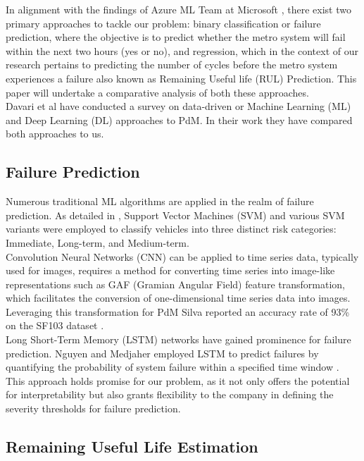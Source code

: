 \documentclass{article}
\begin{document}
In alignment with the findings of Azure ML Team at Microsoft \cite{AzureML2015}, there exist two primary approaches to tackle our problem: binary classification or failure prediction, where the objective is to predict whether the metro system will fail within the next two hours (yes or no), and regression, which in the context of our research pertains to predicting the number of cycles before the metro system experiences a failure also known as Remaining Useful life (RUL) Prediction. This paper will undertake a comparative analysis of both these approaches. \\

Davari et al \cite{Davari2021} have conducted a survey on data-driven or Machine Learning (ML) and Deep Learning (DL) approaches to PdM. In their work they have compared both approaches to us.

\subsection*{Failure Prediction}

Numerous traditional ML algorithms are applied in the realm of failure prediction. As detailed in \cite{chaudhuri2018}, Support Vector Machines (SVM) and various SVM variants were employed to classify vehicles into three distinct risk categories: Immediate, Long-term, and Medium-term. \\

Convolution Neural Networks (CNN) can be applied to time series data, typically used for
images, requires a method for converting time series into image-like representations such as GAF (Gramian Angular Field) feature transformation, which facilitates the conversion of one-dimensional time series data into images. Leveraging this transformation for PdM Silva reported an accuracy rate of 93\% on the SF103 dataset \cite{Silva2019}. \\

Long Short-Term Memory (LSTM) networks have gained prominence for failure prediction. Nguyen and Medjaher employed LSTM to predict failures by quantifying the probability of system failure within a specified time window \cite{nguyen2019}. This approach holds promise for our problem, as it not only offers the potential for interpretability but also grants flexibility to the company in defining the severity thresholds for failure prediction.

\subsection*{Remaining Useful Life Estimation}
\end{document}
